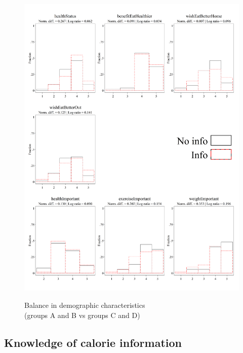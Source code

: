 \documentclass[12pt]{article}
\begin{document}
\begin{figure}[ht]
  \caption{Balance in demographic characteristics \\ (groups A and B vs groups C and D)}\label{fig:group3_health}
  \begin{center}
  {\includegraphics[width=1\textwidth]{./figures/covDifTreat_1_health.png}}
  \end{center}
\end{figure}

\FloatBarrier

\clearpage

\subsection{Knowledge of calorie information}
\end{document}
